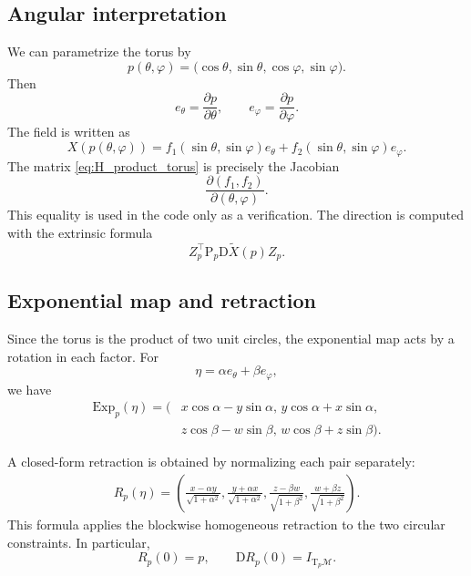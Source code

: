 \documentclass[11pt]{article}
\newcommand{\M}{\mathcal{M}}
\newcommand{\T}{\mathrm{T}}
\newcommand{\D}{\mathrm{D}}
\newcommand{\Proj}{\mathrm{P}}
\newcommand{\Exp}{\mathrm{Exp}}
\begin{document}
\subsection*{Angular interpretation}

We can parametrize the torus by
\begin{equation}\label{eq:parametrization_product_torus}
    p(\theta,\varphi)
    =
    \bigl(
        \cos\theta,\sin\theta,
        \cos\varphi,\sin\varphi
    \bigr).
\end{equation}
Then
\[
    e_\theta=\frac{\partial p}{\partial\theta},
    \qquad
    e_\varphi=\frac{\partial p}{\partial\varphi}.
\]
The field is written as
\[
    X(p(\theta,\varphi))
    =
    f_1(\sin\theta,\sin\varphi)e_\theta
    +
    f_2(\sin\theta,\sin\varphi)e_\varphi.
\]
The matrix \eqref{eq:H_product_torus} is precisely the Jacobian
\[
    \frac{\partial(f_1,f_2)}
         {\partial(\theta,\varphi)}.
\]
This equality is used in the code only as a verification. The
direction is computed with the extrinsic formula
\[
    Z_p^\top \Proj_p\D\widetilde X(p)Z_p.
\]

\subsection*{Exponential map and retraction}

Since the torus is the product of two unit circles, the exponential map
acts by a rotation in each factor. For
\[
    \eta=\alpha e_\theta+\beta e_\varphi,
\]
we have
\begin{equation}\label{eq:exp_product_torus}
\begin{aligned}
    \Exp_p(\eta)
    =
    \bigl(
        &x\cos\alpha-y\sin\alpha,\,
        y\cos\alpha+x\sin\alpha,\\
        &z\cos\beta-w\sin\beta,\,
        w\cos\beta+z\sin\beta
    \bigr).
\end{aligned}
\end{equation}

A closed-form retraction is obtained by normalizing each pair separately:
\begin{equation}\label{eq:retraction_product_torus}
\begin{aligned}
    R_p(\eta)
    =
    \left(
        \frac{x-\alpha y}{\sqrt{1+\alpha^2}},
        \frac{y+\alpha x}{\sqrt{1+\alpha^2}},
        \frac{z-\beta w}{\sqrt{1+\beta^2}},
        \frac{w+\beta z}{\sqrt{1+\beta^2}}
    \right).
\end{aligned}
\end{equation}
This formula applies the blockwise homogeneous retraction to the two
circular constraints. In particular,
\[
    R_p(0)=p,
    \qquad
    \D R_p(0)=I_{\T_p\M}.
\]
\end{document}
